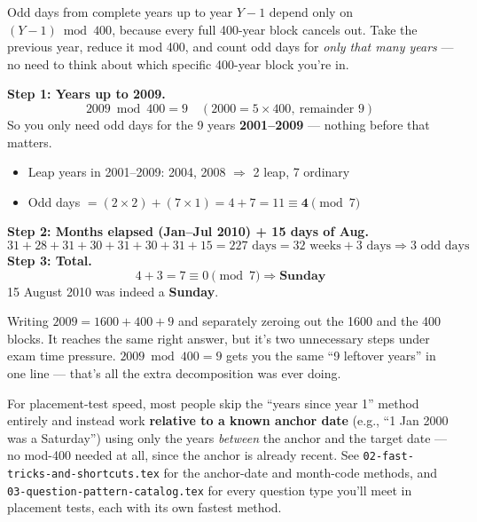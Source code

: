 \documentclass[11pt]{article}
\begin{document}
\begin{tipbox}[Shortcut]
Odd days from complete years up to year $Y-1$ depend only on $(Y-1) \bmod 400$, because every full
400-year block cancels out. Take the previous year, reduce it mod 400, and count odd days for
\emph{only that many years} --- no need to think about which specific 400-year block you're in.
\end{tipbox}

\begin{examplebox}
\textbf{Step 1: Years up to 2009.}
\[
2009 \bmod 400 = 9 \quad (2000 = 5\times 400,\ \text{remainder } 9)
\]
So you only need odd days for the 9 years \textbf{2001--2009} --- nothing before that matters.
\begin{itemize}[leftmargin=1.4em]
  \item Leap years in 2001--2009: 2004, 2008 $\Rightarrow$ 2 leap, 7 ordinary
  \item Odd days $= (2 \times 2) + (7 \times 1) = 4 + 7 = 11 \equiv \textbf{4} \pmod 7$
\end{itemize}
\textbf{Step 2: Months elapsed (Jan--Jul 2010) + 15 days of Aug.}
\[
31+28+31+30+31+30+31+15 = 227 \text{ days} = 32 \text{ weeks} + 3 \text{ days} \Rightarrow 3 \text{ odd days}
\]
\textbf{Step 3: Total.}
\[
4 + 3 = 7 \equiv 0 \pmod 7 \Rightarrow \textbf{Sunday}
\]
15 August 2010 was indeed a \textbf{Sunday}.
\end{examplebox}

\begin{warnbox}
Writing $2009 = 1600 + 400 + 9$ and separately zeroing out the 1600 and the 400 blocks. It reaches
the same right answer, but it's two unnecessary steps under exam time pressure. $2009 \bmod 400 = 9$
gets you the same ``9 leftover years'' in one line --- that's all the extra decomposition was ever
doing.
\end{warnbox}

\begin{tipbox}
For placement-test speed, most people skip the ``years since year 1'' method entirely and instead
work \textbf{relative to a known anchor date} (e.g., ``1 Jan 2000 was a Saturday'') using only the
years \emph{between} the anchor and the target date --- no mod-400 needed at all, since the anchor is
already recent. See \texttt{02-fast-tricks-and-shortcuts.tex} for the anchor-date and month-code
methods, and \texttt{03-question-pattern-catalog.tex} for every question type you'll meet in
placement tests, each with its own fastest method.
\end{tipbox}
\end{document}

